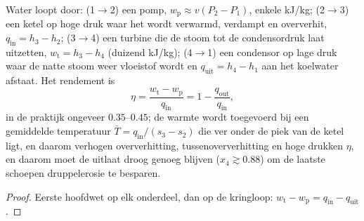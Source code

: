 \begin{proposition}\label{prop:b2:open-systems:rankine}
Water loopt door: (1$\to$2) een pomp, $w_{\text{p}} \approx v(P_2 -
P_1)$,
enkele \unit{kJ/kg}; (2$\to$3) een ketel op hoge druk waar het
wordt verwarmd, verdampt en oververhit, $q_{\text{in}} = h_3 - h_2$;
(3$\to$4) een turbine die de stoom tot de condensordruk laat uitzetten,
$w_{\text{t}} = h_3 - h_4$ (duizend \unit{kJ/kg}); (4$\to$1) een condensor
op lage druk waar de natte stoom weer vloeistof wordt en
$q_{\text{uit}} = h_4 - h_1$ aan het koelwater afstaat. Het rendement is
\[
\eta = \frac{w_{\text{t}} - w_{\text{p}}}{q_{\text{in}}} = 1 - \frac{q_{\text{out}}}{q_{\text{in}}} ,
\]
in de praktijk ongeveer $0.35$--$0.45$; de warmte wordt toegevoerd bij een
gemiddelde
temperatuur $\bar T = q_{\text{in}}/(s_3 - s_2)$ die ver onder de piek van
de ketel ligt,
en daarom verhogen oververhitting, tussenoververhitting en hoge drukken
$\eta$, en daarom moet de uitlaat droog genoeg blijven ($x_4 \gtrsim 0.88$) om
de laatste schoepen druppelerosie te besparen.
\end{proposition}

\begin{proof}
Eerste hoofdwet op elk onderdeel, dan op de kringloop:
$w_{\text{t}} - w_{\text{p}}
= q_{\text{in}} - q_{\text{uit}}$.
\end{proof}

